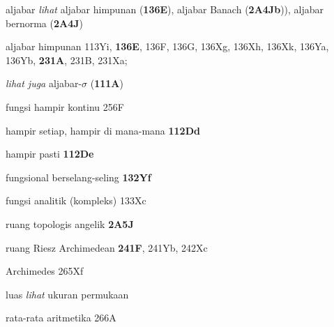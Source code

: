  aljabar {\it lihat} aljabar himpunan ({\bf 136E}), aljabar Banach ({\bf 2A4Jb})), aljabar bernorma ({\bf 2A4J})


aljabar himpunan 113Yi, {\bf 136E}, 136F, 136G, 136Xg, 136Xh, 136Xk, 136Ya, 136Yb, {\bf 231A}, 231B, 231Xa;  

  {\it lihat juga } aljabar-$\sigma$ ({\bf 111A})






 fungsi hampir kontinu 256F







hampir setiap, hampir di mana-mana {\bf 112Dd}








hampir pasti {\bf 112De}

 fungsional berselang-seling {\bf 132Yf}
















 fungsi analitik (kompleks) 133Xc



 ruang topologis angelik {\bf 2A5J}














ruang Riesz Archimedean {\bf 241F}, 241Yb, 242Xc



 Archimedes 265Xf


 luas {\it lihat} ukuran permukaan





 rata-rata aritmetika 266A















